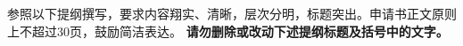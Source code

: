 \documentclass[YF]{nsfc}
\begin{document}
\maketitle

{\kaishu\enkai\fontsize{14pt}{15pt}\selectfont
参照以下提纲撰写，要求内容翔实、清晰，层次分明，标题突出。申请书正文原则上不超过30页，鼓励简洁表达。
\textbf{\color{NSFCblue}请勿删除或改动下述提纲标题及括号中的文字。}\par
\vspace{-3pt}}




\renewcommand{\bibname}{\color{black}\normalfont\normalsize\bfseries 参考文献}


\clearpage


\end{document}
